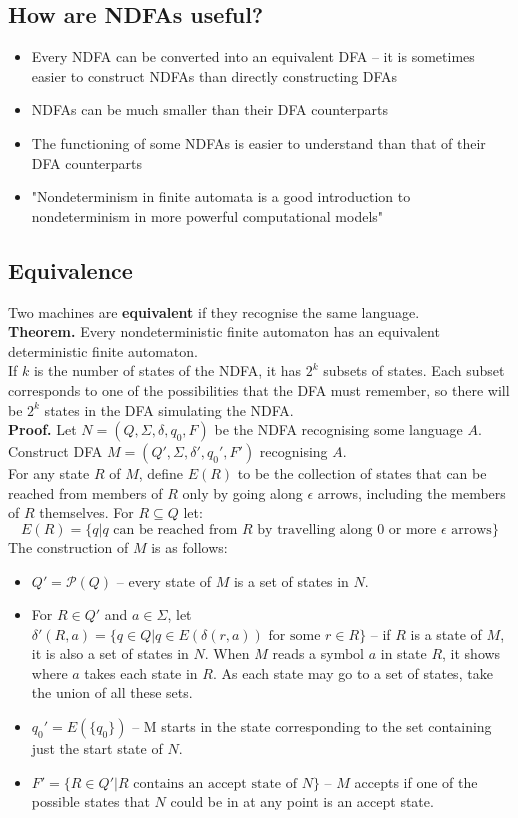 \documentclass{article}
\begin{document}
\subsection{How are NDFAs useful?}
\begin{itemize}
	\item Every NDFA can be converted into an equivalent DFA -- it is sometimes easier to construct NDFAs than directly constructing DFAs
	\item NDFAs can be much smaller than their DFA counterparts
	\item The functioning of some NDFAs is easier to understand than that of their DFA counterparts
	\item "Nondeterminism in finite automata is a good introduction to nondeterminism in more powerful computational models"
\end{itemize}

\subsection{Equivalence}
Two machines are \textbf{equivalent} if they recognise the same language.\medskip
\\\textbf{Theorem.} Every nondeterministic finite automaton has an equivalent deterministic finite automaton.\medskip
\\ If $k$ is the number of states of the NDFA, it has $2^k$ subsets of states. Each subset corresponds to one of the possibilities that the DFA must remember, so there will be $2^k$ states in the DFA simulating the NDFA.\medskip
\\\textbf{Proof.} Let $N = (Q, \Sigma, \delta, q_0, F)$ be the NDFA recognising some language $A$. Construct DFA $M = (Q', \Sigma, \delta', q_0', F')$ recognising $A$.\medskip
\\For any state $R$ of $M$, define $E(R)$ to be the collection of states that can be reached from members of $R$ only by going along $\epsilon$ arrows, including the members of $R$ themselves. For $R \subseteq Q$ let:
$$E(R) = \{q | q \text{ can be reached from } R \text{ by travelling along 0 or more } \epsilon \text{ arrows}\}$$
The construction of $M$ is as follows:
\begin{itemize}
	\item $Q' = \mathcal{P}(Q)$ -- every state of $M$ is a set of states in $N$.
	\item For $R \in Q'$ and $a \in \Sigma$, let $\delta'(R, a) = \{q\in Q | q \in E(\delta(r, a)) \text{ for some } r \in R\}$ -- if $R$ is a state of $M$, it is also a set of states in $N$. When $M$ reads a symbol $a$ in state $R$, it shows where $a$ takes each state in $R$. As each state may go to a set of states, take the union of all these sets.
	\item $q_0' = E(\{q_0\})$ -- M starts in the state corresponding to the set containing just the start state of $N$.
	\item $F' = \{R \in Q' | R\text{ contains an accept state of } N\}$ -- $M$ accepts if one of the possible states that $N$ could be in at any point is an accept state.\hfill\qedsymbol
\end{itemize}
\end{document}
